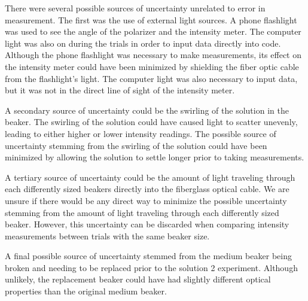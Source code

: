
There were several possible sources of uncertainty unrelated to error in measurement. The first was the use of external light sources.
A phone flashlight was used to see the angle of the polarizer and the intensity meter. The computer light was also on during the trials in order to input data
directly into code. Although the phone flashlight was necessary to make measurements, its effect on the intensity meter could have been minimized by shielding 
the fiber optic cable from the flashlight's light. The computer light was also necessary to input data, but it was not in the direct line of sight of the intensity meter.

A secondary source of uncertainty could be the swirling of the solution in the beaker. The swirling of the solution could have caused light to scatter unevenly, 
leading to either higher or lower intensity readings. The possible source of uncertainty stemming from the swirling of the solution could have been minimized 
by allowing the solution to settle longer prior to taking measurements.

A tertiary source of uncertainty could be the amount of light traveling through each differently sized beakers directly into the fiberglass optical cable. 
We are unsure if there would be any direct way to minimize the possible uncertainty stemming from the amount of light traveling through each differently sized beaker.
However, this uncertainty can be discarded when comparing intensity measurements between trials with the same beaker size.

A final possible source of uncertainty stemmed from the medium beaker being broken and needing to be replaced prior to the solution 2 experiment. Although unlikely,
the replacement beaker could have had slightly different optical properties than the original medium beaker. 